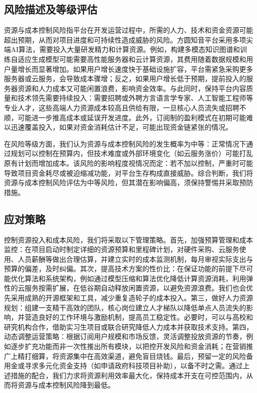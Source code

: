 \subsection{风险描述及等级评估}
资源与成本控制风险指平台在开发运营过程中，所需的人力、技术和资金资源可能超出预期，从而对项目进度和可持续性造成威胁的风险。方圆知音平台采用多项尖端AI算法，需要投入大量研发精力和计算资源。例如，构建多模态知识图谱和训练自适应生成模型可能需要高性能服务器和云计算资源，其费用随着数据规模和用户量增长而显著增加。如果用户增长速度快于基础设施扩容，平台需紧急采购更多服务器或云服务，会导致成本骤增；反之，如果用户增长低于预期，提前投入的服务器资源和人力成本又可能闲置浪费，影响资金效率。与此同时，保持平台内容质量和技术领先需要持续投入：需要招聘或外聘方言语言学专家、人工智能工程师等专业人才，这些高端人力资源成本较高且供给有限，一旦核心人员流失或招聘不顺，可能进一步推高成本或延误开发进度。此外，订阅制的盈利模式在初期可能难以迅速覆盖投入，如果对资金消耗估计不足，可能出现资金链紧张的情况。

在风险等级方面，我们认为资源与成本控制风险的发生概率为中等：正常情况下通过规划可以控制在预算内，但技术难度或外部环境变化（如云服务涨价）可能打乱原有计划而增加成本。该风险的影响程度视情况而定：若不加以控制，严重时可能导致项目资金耗尽或被迫缩减功能，对平台生存构成直接威胁。综合判断，我们将资源与成本控制风险评估为中等风险，但其潜在影响偏高，须保持警惕并采取预防措施。

\subsection{应对策略}
控制资源投入和成本风险，我们将采取以下管理策略。首先，加强预算管理和成本监控：在项目启动时制定详细的资源预算和里程碑计划，对硬件采购、云服务使用、人员薪酬等做出合理估算，并建立实时的成本监测机制，每月审视实际支出与预算的偏差，及时纠偏。其次，提高技术方案的性价比：在保证功能的前提下尽可能优化算法和系统架构，例如通过模型压缩和算法优化降低计算资源消耗，利用弹性的云服务按需扩展，在低谷期自动释放闲置资源，以避免资源浪费。我们也会优先采用成熟的开源框架和工具，减少重复造轮子的成本投入。第三，做好人力资源规划：组建一支精干高效的团队，核心岗位建立人才梯队以降低单点人员流失的影响，并营造良好的工作环境与激励机制，提高员工稳定性。必要时，可以与高校和研究机构合作，借助实习生项目或联合研究降低人力成本并获取技术支持。第四，动态调整运营策略：根据订阅用户规模和市场反馈，灵活调整投放资源的节奏，例如逐步扩充功能而非一次性推出所有模块，以把控开发风险和资金消耗；在营销推广上精打细算，将资源集中在高效渠道，避免盲目烧钱。最后，预留一定的风险备用金或寻求多元化资金支持（如申请政府科技项目补助），以备不时之需。通过上述措施的配合，我们力求将资源利用效率最大化，保持成本开支在可控范围内，从而将资源与成本控制风险降到最低。
